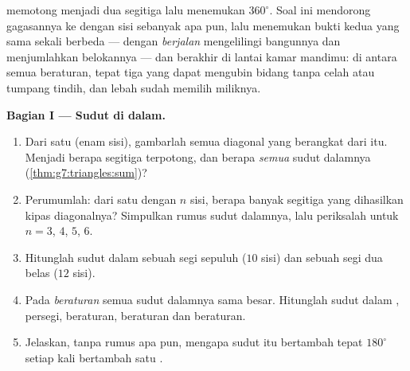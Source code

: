 \begin{problem}
\label{pb:g7:triangles:1}
 memotong  menjadi dua segitiga
lalu menemukan $360^\circ$. Soal ini mendorong gagasannya ke  dengan sisi sebanyak apa pun, lalu menemukan bukti kedua yang
sama sekali berbeda --- dengan \emph{berjalan} mengelilingi bangunnya
dan menjumlahkan belokannya --- dan berakhir di lantai kamar mandimu:
di antara semua  beraturan, tepat tiga yang dapat mengubin
bidang tanpa celah atau tumpang tindih, dan lebah sudah memilih
miliknya.

\medskip
\noindent\textbf{Bagian I --- Sudut di dalam.}
\begin{enumerate}
  \item Dari satu   (enam sisi), gambarlah semua
        diagonal yang berangkat dari  itu. Menjadi berapa
        segitiga  terpotong, dan berapa 
        \emph{semua} sudut dalamnya
        (\cref{thm:g7:triangles:sum})?
  \item Perumumlah: dari satu   dengan $n$ sisi,
        berapa banyak segitiga yang dihasilkan kipas diagonalnya?
        Simpulkan rumus  sudut dalamnya, lalu periksalah untuk
        $n = 3$, $4$, $5$, $6$.
  \item Hitunglah  sudut dalam sebuah segi sepuluh
        ($10$ sisi) dan sebuah segi dua belas ($12$ sisi).
  \item Pada  \emph{beraturan} semua sudut dalamnya sama
        besar. Hitunglah sudut dalam , persegi,  beraturan,  beraturan dan 
        beraturan.
  \item Jelaskan, tanpa rumus apa pun, mengapa  sudut itu
        bertambah tepat $180^\circ$ setiap kali 
        bertambah satu .
\end{enumerate}


\end{problem}
